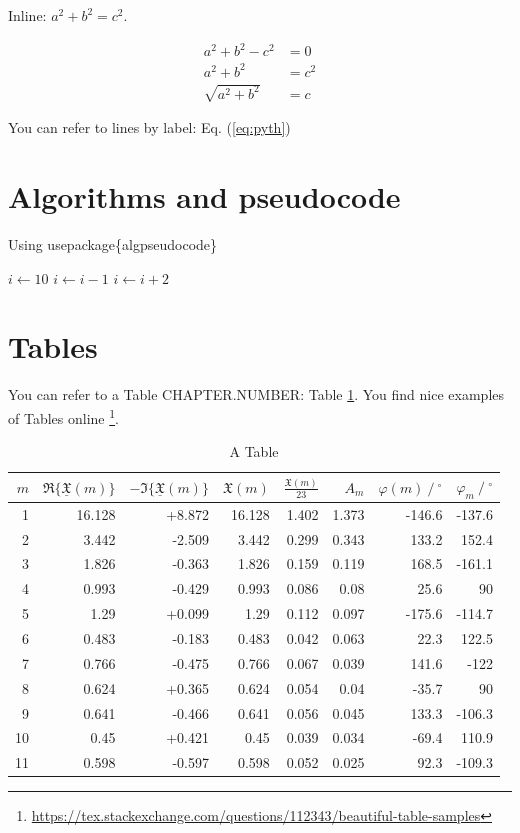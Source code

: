 Inline: $a^2+b^2=c^2$.

\begin{align}
a^2+b^2-c^2&=0\\
a^2+b^2&=c^2 \label{eq:pyth}\\
\sqrt{a^2+b^2}&=c
\end{align}

You can refer to lines by label: Eq. (\ref{eq:pyth})

\section{Algorithms and pseudocode}
Using usepackage\{algpseudocode\}
\\

\begin{algorithmic}
	\State $i \gets 10$
	\State $i \gets i-1$
	\Else
	\State $i \gets i+2$
	\EndIf
	\EndIf 
\end{algorithmic}

\section{Tables} 
You can refer to a Table CHAPTER.NUMBER: Table \ref{tab:example1}. You find nice examples of Tables online \footnote{\url{https://tex.stackexchange.com/questions/112343/beautiful-table-samples}}.
\begin{table}[!hb]
	\centering
	\begin{tabular}{rrrrrrrr} \toprule
		{$m$} & {$\Re\{\underline{\mathfrak{X}}(m)\}$} & {$-\Im\{\underline{\mathfrak{X}}(m)\}$} & {$\mathfrak{X}(m)$} & {$\frac{\mathfrak{X}(m)}{23}$} & {$A_m$} & {$\varphi(m)\ /\ ^{\circ}$} & {$\varphi_m\ /\ ^{\circ}$} \\ \midrule
		1  & 16.128 & +8.872 & 16.128 & 1.402 & 1.373 & -146.6 & -137.6 \\
		2  & 3.442  & -2.509 & 3.442  & 0.299 & 0.343 & 133.2  & 152.4  \\
		3  & 1.826  & -0.363 & 1.826  & 0.159 & 0.119 & 168.5  & -161.1 \\
		4  & 0.993  & -0.429 & 0.993  & 0.086 & 0.08  & 25.6   & 90     \\ \midrule
		5  & 1.29   & +0.099 & 1.29   & 0.112 & 0.097 & -175.6 & -114.7 \\
		6  & 0.483  & -0.183 & 0.483  & 0.042 & 0.063 & 22.3   & 122.5  \\
		7  & 0.766  & -0.475 & 0.766  & 0.067 & 0.039 & 141.6  & -122   \\
		8  & 0.624  & +0.365 & 0.624  & 0.054 & 0.04  & -35.7  & 90     \\ \midrule
		9  & 0.641  & -0.466 & 0.641  & 0.056 & 0.045 & 133.3  & -106.3 \\
		10 & 0.45   & +0.421 & 0.45   & 0.039 & 0.034 & -69.4  & 110.9  \\
		11 & 0.598  & -0.597 & 0.598  & 0.052 & 0.025 & 92.3   & -109.3 \\ \bottomrule
	\end{tabular}
\caption{A Table}
\label{tab:example1}
\end{table}

